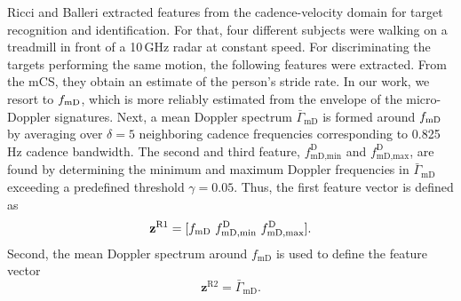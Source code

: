 Ricci and Balleri \cite{Ric15} extracted features from the cadence-velocity domain for target recognition and identification. For that, four different subjects were walking on a treadmill in front of a 10\,GHz radar at constant speed. For discriminating the targets performing the same motion, the following features were extracted. From the mCS, they obtain an estimate of the person's stride rate. In our work, we resort to ${f_\text{mD}}$, which is more reliably estimated from the envelope of the micro-Doppler signatures. Next, a mean Doppler spectrum $\bar{\Gamma}_\text{mD}$ is formed around ${f_\text{mD}}$ by averaging over $\delta = 5$ neighboring cadence frequencies corresponding to 0.825\,Hz cadence bandwidth. The second and third feature, $f^\mathrm{D}_\text{mD,min}$ and $f^\mathrm{D}_\text{mD,max}$, are found by determining the minimum and maximum Doppler frequencies in $\bar{\Gamma}_\text{mD}$ exceeding a predefined threshold $\gamma = 0.05$. 
Thus, the first feature vector is defined as
\begin{equation} \label{eq:Ric1}
\mathbf{z}^\text{R1} = [{f_\text{mD}}~f^\text{D}_{\text{mD,min}}~f^\text{D}_{\text{mD,max}}].
\end{equation}
Second, the mean Doppler spectrum around $f_\text{mD}$ is used to define the feature vector
\begin{equation} \label{eq:Ric2}
\mathbf{z}^\text{R2} = \bar{\Gamma}_{\text{mD}}.
\end{equation}


